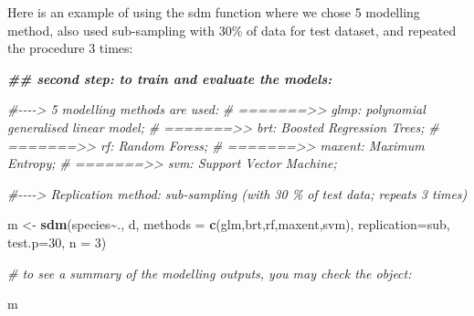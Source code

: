\documentclass[
]{article}
\newenvironment{Shaded}{\begin{snugshade}}{\end{snugshade}}
\newcommand{\AttributeTok}[1]{\textcolor[rgb]{0.13,0.29,0.53}{#1}}
\newcommand{\CommentTok}[1]{\textcolor[rgb]{0.56,0.35,0.01}{\textit{#1}}}
\newcommand{\DecValTok}[1]{\textcolor[rgb]{0.00,0.00,0.81}{#1}}
\newcommand{\DocumentationTok}[1]{\textcolor[rgb]{0.56,0.35,0.01}{\textbf{\textit{#1}}}}
\newcommand{\FunctionTok}[1]{\textcolor[rgb]{0.13,0.29,0.53}{\textbf{#1}}}
\newcommand{\NormalTok}[1]{#1}
\newcommand{\OtherTok}[1]{\textcolor[rgb]{0.56,0.35,0.01}{#1}}
\newcommand{\SpecialCharTok}[1]{\textcolor[rgb]{0.81,0.36,0.00}{\textbf{#1}}}
\newcommand{\StringTok}[1]{\textcolor[rgb]{0.31,0.60,0.02}{#1}}
\begin{document}
Here is an example of using the sdm function where we chose 5 modelling
method, also used sub-sampling with 30\% of data for test dataset, and
repeated the procedure 3 times:

\begin{Shaded}
\begin{Highlighting}[]
\DocumentationTok{\#\# second step: to train and evaluate the models:}

\CommentTok{\#{-}{-}{-}{-}\textgreater{} 5 modelling methods are used: }
\CommentTok{\# =======\textgreater{}\textgreater{} glmp: polynomial generalised linear model; }
\CommentTok{\# =======\textgreater{}\textgreater{} brt: Boosted Regression Trees; }
\CommentTok{\# =======\textgreater{}\textgreater{} rf: Random Foress; }
\CommentTok{\# =======\textgreater{}\textgreater{} maxent: Maximum Entropy; }
\CommentTok{\# =======\textgreater{}\textgreater{} svm: Support Vector Machine; }

\CommentTok{\#{-}{-}{-}{-}\textgreater{} Replication method: sub{-}sampling (with 30 \% of test data; repeats 3 times)}

\NormalTok{m }\OtherTok{\textless{}{-}} \FunctionTok{sdm}\NormalTok{(species}\SpecialCharTok{\textasciitilde{}}\NormalTok{., d, }\AttributeTok{methods =} \FunctionTok{c}\NormalTok{(}\StringTok{\textquotesingle{}glm\textquotesingle{}}\NormalTok{,}\StringTok{\textquotesingle{}brt\textquotesingle{}}\NormalTok{,}\StringTok{\textquotesingle{}rf\textquotesingle{}}\NormalTok{,}\StringTok{\textquotesingle{}maxent\textquotesingle{}}\NormalTok{,}\StringTok{\textquotesingle{}svm\textquotesingle{}}\NormalTok{),}
         \AttributeTok{replication=}\StringTok{\textquotesingle{}sub\textquotesingle{}}\NormalTok{, }\AttributeTok{test.p=}\DecValTok{30}\NormalTok{, }\AttributeTok{n =} \DecValTok{3}\NormalTok{)}


\CommentTok{\# to see a summary of the modelling outputs, you may check the object:}

\NormalTok{m}
\end{Highlighting}
\end{Shaded}
\end{document}
